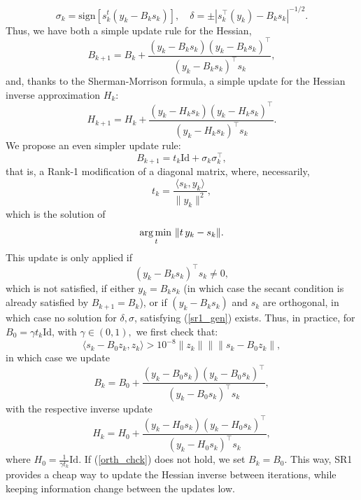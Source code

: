 \documentclass[11pt, twoside]{report}
\begin{document}
\[\sigma_k = \mathrm{sign}[s_k^t(y_k - B_k s_k)], \quad \delta = \pm |s_k^\top (y_k) - B_ks_k|^{-1/2}.\]
Thus, we have both a simple update rule for the Hessian,
\begin{equation} \label{sr1_upd}
    B_{k+1} = B_k + \frac{(y_k - B_ks_k)(y_k - B_ks_k)^\top}{(y_k - B_ks_k)^\top s_k},
\end{equation}
and, thanks to the Sherman-Morrison formula, a simple update for the Hessian inverse approximation $H_k$:
\begin{equation} \label{sr1_upd2}
    H_{k+1} = H_k + \frac{(y_k - H_ks_k)(y_k - H_ks_k)^\top}{(y_k - H_ks_k)^\top s_k}.
\end{equation}
We propose an even simpler update rule:
\begin{equation} \label{sr1_poon}
    B_{k+1} = t_k \mathrm{Id} + \sigma_k \sigma_k^\top,
\end{equation}
that is, a Rank-1 modification of a diagonal matrix, where, necessarily,
$$t_k = \frac{\langle s_k, y_k \rangle}{\|y_k\|^2},$$
which is the solution of 
\[\operatorname*{arg\, min \,}_t \|t\,y_k - s_k\|.\]
This update is only applied if 
\[(y_k - B_ks_k)^\top s_k \neq 0,\]
which is not satisfied, if either $y_k = B_k s_k$ (in which case the secant condition is already satisfied by $B_{k+1} = B_k$), or if $(y_k - B_ks_k)$ and $s_k$ are orthogonal, in which case no solution for $\delta, \sigma$, satisfying (\ref{sr1_gen}) exists. Thus, in practice, for $B_0 = \gamma t_k \mathrm{Id}$, with $\gamma \in (0,1),$ we first check that:
\begin{equation} \label{orth_chck}
    \langle s_k - B_0z_k,z_k \rangle > 10^{-8} \|z_k\|\|\|s_k - B_0z_k\|,
\end{equation}
in which case we update
\[B_{k} = B_0 + \frac{(y_k - B_0s_k)(y_k - B_0s_k)^\top}{(y_k - B_0s_k)^\top s_k},\]
with the respective inverse update
\begin{equation*} \label{sr1_new_upd}
    H_{k} = H_0 + \frac{(y_k - H_0s_k)(y_k - H_0s_k)^\top}{(y_k - H_0s_k)^\top s_k},
\end{equation*}
where $H_0 = \frac{1}{\gamma t_k} \mathrm{Id}$. If (\ref{orth_chck}) does not hold, we set $B_{k} = B_0.$ This way, SR1 provides a cheap way to update the Hessian inverse between iterations, while keeping information change between the updates low.
\end{document}
